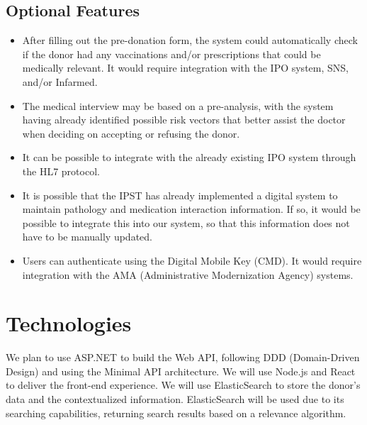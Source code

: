 \documentclass[a4paper,11pt]{article}
\begin{document}
\subsection{Optional Features}
\begin{itemize}
	\item After filling out the pre-donation form, the system could automatically check if the donor had any vaccinations and/or prescriptions that could be medically relevant. It would require integration with the IPO system, SNS, and/or Infarmed.
	\item The medical interview may be based on a pre-analysis, with the system having already identified possible risk vectors that better assist the doctor when deciding on accepting or refusing the donor.
	\item It can be possible to integrate with the already existing IPO system through the HL7 protocol. \cite{hl7}
	\item It is possible that the IPST has already implemented a digital system to maintain pathology and medication interaction information. If so, it would be possible to integrate this into our system, so that this information does not have to be manually updated.
	\item Users can authenticate using the Digital Mobile Key (CMD). It would require integration with the AMA (Administrative Modernization Agency) systems.
\end{itemize}

\section{Technologies}
We plan to use ASP.NET \cite{aspnet} to build the Web API, following DDD (Domain-Driven Design) and using the Minimal API \cite{minimalAPI} architecture. We will use Node.js \cite{nodejs} and React \cite{react} to deliver the front-end experience. We will use ElasticSearch \cite{elasticsearch} to store the donor’s data and the contextualized information. ElasticSearch will be used due to its searching capabilities, returning search results based on a relevance algorithm.
\end{document}
